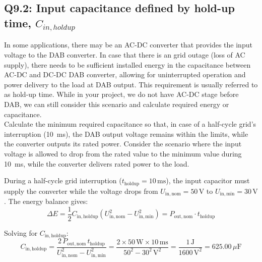 \documentclass{PELsmallreport}
\begin{document}
\subsection{Q9.2: Input capacitance defined by hold-up time, $C_{in, hold up}$}
In some applications, there may be an AC-DC converter that provides the input voltage to the DAB converter. In case that there is an grid outage (loss of AC supply), there needs to be sufficient installed energy in the capacitance between AC-DC and DC-DC DAB converter, allowing for uninterrupted operation and power delivery to the load at DAB output. This requirement is usually referred to as hold-up time. While in your project, we do not have AC-DC stage before DAB, we can still consider this scenario and calculate required energy or capacitance. \\

Calculate the minimum required capacitance so that, in case of a half-cycle grid's interruption (\SI{10}{\milli\second}), the DAB output voltage remains within the limits, while the converter outputs its rated power. Consider the scenario where the input voltage is allowed to drop from the rated value to the minimum value during \SI{10}{\milli\second}, while the converter delivers rated power to the load.
\\
     \begin{framed}
        \vspace{2em}
           During a half-cycle grid interruption ($t_\mathrm{holdup} = 10\,\mathrm{ms}$),
the input capacitor must supply the converter while the voltage drops from
$U_\mathrm{in,nom} = 50\,\mathrm{V}$ to $U_\mathrm{in,min} = 30\,\mathrm{V}$.
The energy balance gives:
\begin{equation}
    \Delta E = \frac{1}{2}C_\mathrm{in,holdup}
    \left(U_\mathrm{in,nom}^2 - U_\mathrm{in,min}^2\right)
    = P_\mathrm{out,nom}\cdot t_\mathrm{holdup}
\end{equation}

Solving for $C_\mathrm{in,holdup}$:
\begin{equation}
    C_\mathrm{in,holdup}
        = \frac{2\,P_\mathrm{out,nom}\,t_\mathrm{holdup}}
               {U_\mathrm{in,nom}^2 - U_\mathrm{in,min}^2}
        = \frac{2\times50\,\mathrm{W}\times10\,\mathrm{ms}}
               {50^2 - 30^2\,\mathrm{V}^2}
        = \frac{1\,\mathrm{J}}{1600\,\mathrm{V}^2}
        = 625.00\,\mu\mathrm{F}
\end{equation}
            
        \vspace{2em}
    \end{framed}
            
\end{document}
